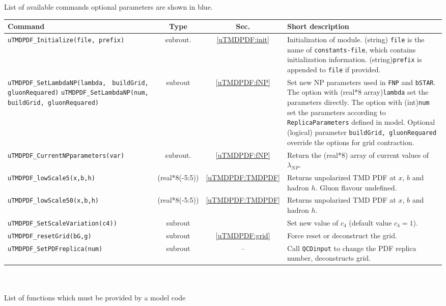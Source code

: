 \documentclass[prd,nofootinbib,eqsecnum,final]{revtex4}
\renewcommand{\(}{\left(}
\renewcommand{\)}{\right)}
\renewcommand{\[}{\left[}
\renewcommand{\]}{\right]}
\newcommand{\blue}[1]{{\color{blue} #1}}
\begin{document}
\begin{center}
List of available commands \blue{optional parameters are shown in blue.}
\\
\begin{tabular}{||p{5.5cm}||c|c||p{8.5cm}||}
\hline\hline
Command &~~Type~~& ~~Sec.~~ & Short description
\\\hline
\texttt{uTMDPDF{\_}Initialize(file,\blue{prefix}) } & subrout. &\ref{uTMDPDF:init} & Initialization of module. (string) \texttt{file} is the name of \texttt{constants-file}, which contains initialization information. (string)\texttt{prefix} is appended to \texttt{file} if provided.
\\\hline
\texttt{uTMDPDF{\_}SetLambdaNP(lambda,} \texttt{\blue{buildGrid, gluonRequared})}
\texttt{uTMDPDF{\_}SetLambdaNP(num,} \texttt{\blue{buildGrid, gluonRequared})}
& subrout & \ref{uTMDPDF:fNP}& Set new NP parameters used in \texttt{FNP} and \texttt{bSTAR}. The option with (real*8 array)\texttt{lambda} set the parameters directly. The option with (int)\texttt{num} set the parameters according to \texttt{ReplicaParameters} defined in model. Optional (logical) parameter \texttt{buildGrid, gluonRequared} override the options for grid contraction.
\\\hline
\texttt{uTMDPDF\_CurrentNPparameters(var)} & subrout. &\ref{uTMDPDF:fNP} & Return the (real*8) array of current values of $\lambda_{NP}$.
\\\hline
\texttt{uTMDPDF{\_}lowScale5(x,b,h)} &(real*8(-5:5)) & \ref{uTMDPDF:TMDPDF} & Returns unpolarized TMD PDF at $x$, $b$ and hadron $h$. Gluon flavour undefined.
\\\hline
\texttt{uTMDPDF{\_}lowScale50(x,b,h)} &(real*8(-5:5)) & \ref{uTMDPDF:TMDPDF}&  Returns unpolarized TMD PDF at $x$, $b$ and hadron $h$.
\\\hline
\texttt{uTMDPDF{\_}SetScaleVariation(c4))}& subrout &  & Set new value of $c_4$ (default value $c_4=1$).
\\\hline
\texttt{uTMDPDF{\_}resetGrid(bG,g)}& subrout & \ref{uTMDPDF:grid}& Force reset or deconstruct the grid.
\\\hline
\texttt{uTMDPDF{\_}SetPDFreplica(num)}& subrout & -- & Call \texttt{QCDinput} to change the PDF replica number, deconstructs grid.
\\
\hline\hline
\end{tabular}
\\
~
\\
List of functions which must be provided by a model code
\\

\end{center}
\end{document}

